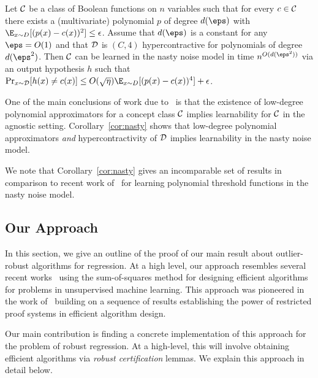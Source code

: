 \begin{corollary} \label{cor:nasty}
Let ${\cal C}$ be a class of Boolean functions on $n$ variables such that for every $c \in {\cal C}$ there exists a (multivariate) polynomial $p$ of degree $d(\eps)$ with $\E_{x \sim D}[(p(x) - c(x))^2] \leq \epsilon$.  Assume that $d(\eps)$ is a constant for any $\eps = O(1)$ and that ${\cal D}$ is $(C,4)$ hypercontractive for polynomials of degree $d(\eps^2)$.  Then ${\cal C}$ can be learned in the nasty noise model in time $n^{O(d(\eps^2))}$ via an output hypothesis $h$ such that $\Pr_{x \sim {\cal D}}[h(x) \neq c(x)] \leq O(\sqrt{\eta}) \E_{x \sim D}[(p(x) - c(x))^4] + \epsilon$.  
\end{corollary}
One of the main conclusions of work due to~\citet{DBLP:journals/siamcomp/KalaiKMS08} is that the existence of low-degree polynomial approximators for a concept class ${\cal C}$ implies learnability for ${\cal C}$ in the agnostic setting.  Corollary~\ref{cor:nasty} shows that low-degree polynomial approximators {\em and} hypercontractivity of ${\cal D}$ implies learnability in the nasty noise model. 

We note that Corollary~\ref{cor:nasty} gives an incomparable set of results in comparison to recent work of~\citet{DBLP:journals/corr/DiakonikolasKS17} for learning polynomial threshold functions in the nasty noise model.  %

\subsection{Our Approach} \label{sec:overview}
In this section, we give an outline of the proof of our main result about outlier-robust algorithms for regression. At a high level, our approach resembles several recent works~\cite{DBLP:journals/corr/MaSS16,DBLP:conf/colt/BarakM16,DBLP:conf/colt/PotechinS17,DBLP:journals/corr/abs-1711-11581,HopkinsLi17} using the sum-of-squares method for designing efficient algorithms for problems in unsupervised machine learning. This approach was pioneered in the work of~\cite{MR3388192-Barak15} building on a sequence of results establishing the power of restricted proof systems in efficient algorithm design. 

Our main contribution is finding a concrete implementation of this approach for the problem of robust regression. At a high-level, this will involve obtaining efficient algorithms via \emph{robust certification} lemmas. We explain this approach in detail below. 

